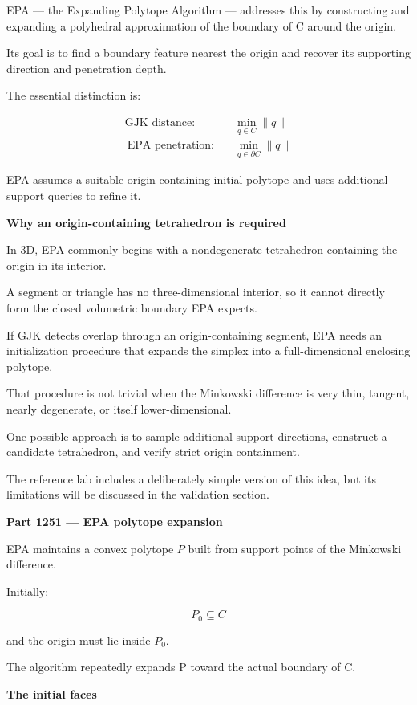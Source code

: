 EPA --- the Expanding Polytope Algorithm --- addresses this by constructing and expanding a polyhedral approximation of the boundary of C around the origin.

Its goal is to find a boundary feature nearest the origin and recover its supporting direction and penetration depth.

The essential distinction is:

\[
\boxed{ \begin{aligned} \text{GJK distance:}&\quad \min_{q\in C}\|q\|\\\ \text{EPA penetration:}&\quad \min_{q\in\partial C}\|q\| \end{aligned} }
\]

EPA assumes a suitable origin-containing initial polytope and uses additional support queries to refine it.

\textbf{Why an origin-containing tetrahedron is required}

In 3D, EPA commonly begins with a nondegenerate tetrahedron containing the origin in its interior.

A segment or triangle has no three-dimensional interior, so it cannot directly form the closed volumetric boundary EPA expects.

If GJK detects overlap through an origin-containing segment, EPA needs an initialization procedure that expands the simplex into a full-dimensional enclosing polytope.

That procedure is not trivial when the Minkowski difference is very thin, tangent, nearly degenerate, or itself lower-dimensional.

One possible approach is to sample additional support directions, construct a candidate tetrahedron, and verify strict origin containment.

The reference lab includes a deliberately simple version of this idea, but its limitations will be discussed in the validation section.

\textbf{Part 1251 --- EPA polytope expansion}

EPA maintains a convex polytope \(P\) built from support points of the Minkowski difference.

Initially:

\[
P_0\subseteq C
\]

and the origin must lie inside \(P_0\).

The algorithm repeatedly expands P toward the actual boundary of C.

\textbf{The initial faces}

